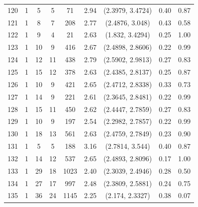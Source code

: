 \documentclass{article}
\begin{document}
\begin{appendices}
\begin{longtable}{ccccccccc}
120 &   1 &   5 &   5 &  71 & 2.94 & (2.3979, 3.4724) & 0.40 & 0.87 \\ 
121 &   1 &   8 &   7 & 208 & 2.77 & (2.4876, 3.048) & 0.43 & 0.58 \\ 
122 &   1 &   9 &   4 &  21 & 2.63 & (1.832, 3.4294) & 0.25 & 1.00 \\ 
123 &   1 &  10 &   9 & 416 & 2.67 & (2.4898, 2.8606) & 0.22 & 0.99 \\ 
124 &   1 &  12 &  11 & 438 & 2.79 & (2.5902, 2.9813) & 0.27 & 0.83 \\ 
125 &   1 &  15 &  12 & 378 & 2.63 & (2.4385, 2.8137) & 0.25 & 0.87 \\ 
126 &   1 &  10 &   9 & 421 & 2.65 & (2.4712, 2.8338) & 0.33 & 0.73 \\ 
127 &   1 &  14 &   9 & 221 & 2.61 & (2.3645, 2.8481) & 0.22 & 0.99 \\ 
128 &   1 &  15 &  11 & 450 & 2.62 & (2.4447, 2.7859) & 0.27 & 0.83 \\ 
129 &   1 &  10 &   9 & 197 & 2.54 & (2.2982, 2.7857) & 0.22 & 0.99 \\ 
130 &   1 &  18 &  13 & 561 & 2.63 & (2.4759, 2.7849) & 0.23 & 0.90 \\ 
131 &   1 &   5 &   5 & 188 & 3.16 & (2.7814, 3.544) & 0.40 & 0.87 \\ 
132 &   1 &  14 &  12 & 537 & 2.65 & (2.4893, 2.8096) & 0.17 & 1.00 \\ 
133 &   1 &  29 &  18 & 1023 & 2.40 & (2.3039, 2.4946) & 0.28 & 0.50 \\ 
134 &   1 &  27 &  17 & 997 & 2.48 & (2.3809, 2.5881) & 0.24 & 0.75 \\ 
135 &   1 &  36 &  24 & 1145 & 2.25 & (2.174, 2.3327) & 0.38 & 0.07 \\ 
\end{longtable}
%
\end{appendices}



\end{document}
